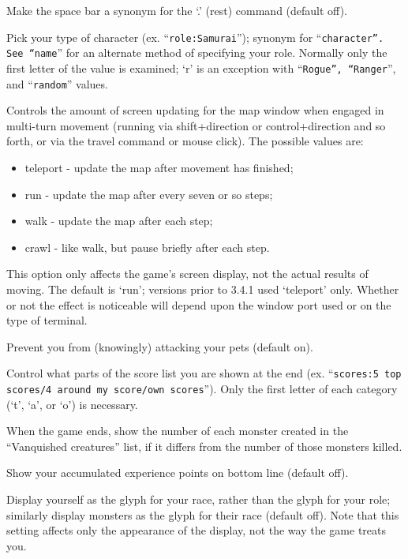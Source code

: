 Make the space bar a synonym for the `.' (rest) command (default off).
\item[\tb{``role    ''}]
Pick your type of character (ex. ``{\tt role:Samurai}'');
synonym for ``{\tt character''.  See ``name}'' for an alternate method
of specifying your role.  Normally only the first letter of the
value is examined; `r' is an exception with ``{\tt Rogue'', ``Ranger}'',
and ``{\tt random}'' values.
\item[\tb{runmode}]
Controls the amount of screen updating for the map window when engaged
in multi-turn movement (running via shift+direction or control+direction
and so forth, or via the travel command or mouse click).
The possible values are:
\begin{itemize}
\item teleport - update the map after movement has finished;
\item run - update the map after every seven or so steps;
\item walk - update the map after each step;
\item crawl - like walk, but pause briefly after each step.
\end{itemize}
This option only affects the game's screen display, not the actual
results of moving.  The default is `run'; versions prior to 3.4.1 
used `teleport' only.  Whether or not the effect is noticeable will
depend upon the window port used or on the type of terminal.
\item[\tb{safe\_pet}]
Prevent you from (knowingly) attacking your pets (default on).
\item[\tb{scores}]
Control what parts of the score list you are shown at the end (ex.
``{\tt scores:5 top scores/4 around my score/own scores}'').  Only the first
letter of each category (`t', `a', or `o') is necessary.
\item[\ib{showborn}]
When the game ends, show the number of each monster created
in the ``Vanquished creatures'' list, if it differs from the
number of those monsters killed.
\item[\tb{showexp}]
Show your accumulated experience points on bottom line (default off).
\item[\tb{showrace}]
Display yourself as the glyph for your race, rather than the glyph
for your role; similarly display monsters as the glyph for their race
(default off).  Note that this setting affects only the appearance of
the display, not the way the game treats you.
\item[\tb{showscore}]
